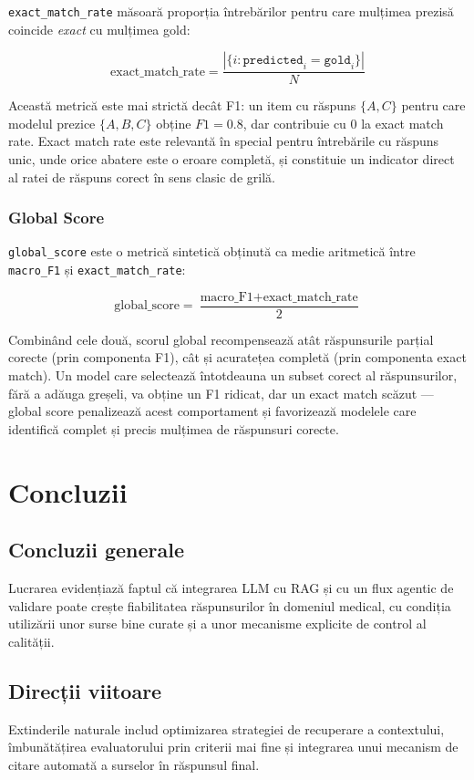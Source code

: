 \documentclass[12pt, a4paper, oneside, romanian]{teza-upb}
\begin{document}
\texttt{exact\_match\_rate} măsoară proporția întrebărilor pentru care mulțimea prezisă coincide \textit{exact} cu mulțimea gold:

\[ \text{exact\_match\_rate} = \frac{|\{i : \texttt{predicted}_i = \texttt{gold}_i\}|}{N} \]

Această metrică este mai strictă decât F1: un item cu răspuns $\{A, C\}$ pentru care modelul prezice $\{A, B, C\}$ obține $F1 = 0.8$, dar contribuie cu $0$ la exact match rate. Exact match rate este relevantă în special pentru întrebările cu răspuns unic, unde orice abatere este o eroare completă, și constituie un indicator direct al ratei de răspuns corect în sens clasic de grilă.

\subsection{Global Score}

\texttt{global\_score} este o metrică sintetică obținută ca medie aritmetică între \texttt{macro\_F1} și \texttt{exact\_match\_rate}:

\[ \text{global\_score} = \frac{\text{macro\_F1} + \text{exact\_match\_rate}}{2} \]

Combinând cele două, scorul global recompensează atât răspunsurile parțial corecte (prin componenta F1), cât și acuratețea completă (prin componenta exact match). Un model care selectează întotdeauna un subset corect al răspunsurilor, fără a adăuga greșeli, va obține un F1 ridicat, dar un exact match scăzut --- global score penalizează acest comportament și favorizează modelele care identifică complet și precis mulțimea de răspunsuri corecte.
\chapter{Concluzii}
\section{Concluzii generale}
Lucrarea evidențiază faptul că integrarea LLM cu RAG și cu un flux agentic de validare poate crește fiabilitatea răspunsurilor în domeniul medical, cu condiția utilizării unor surse bine curate și a unor mecanisme explicite de control al calității.

\section{Direcții viitoare}
Extinderile naturale includ optimizarea strategiei de recuperare a contextului, îmbunătățirea evaluatorului prin criterii mai fine și integrarea unui mecanism de citare automată a surselor în răspunsul final.
\end{document}
